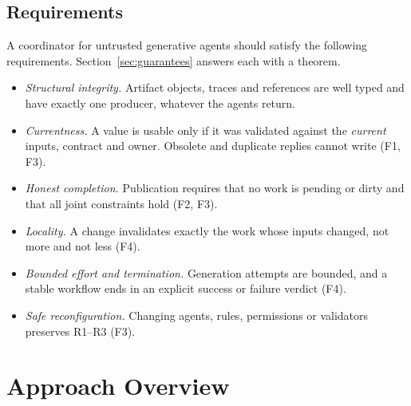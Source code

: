 \documentclass[10pt,journal,compsoc]{IEEEtran}
\theoremstyle{plain}
\theoremstyle{definition}
\begin{document}
\subsection{Requirements}\label{sec:requirements}
A coordinator for untrusted generative agents should satisfy the following requirements. Section~\ref{sec:guarantees} answers each with a theorem.
\begin{itemize}
\item[\textbf{R1}] \emph{Structural integrity.} Artifact objects, traces and references are well typed and have exactly one producer, whatever the agents return.
\item[\textbf{R2}] \emph{Currentness.} A value is usable only if it was validated against the \emph{current} inputs, contract and owner. Obsolete and duplicate replies cannot write (F1, F3).
\item[\textbf{R3}] \emph{Honest completion.} Publication requires that no work is pending or dirty and that all joint constraints hold (F2, F3).
\item[\textbf{R4}] \emph{Locality.} A change invalidates exactly the work whose inputs changed, not more and not less (F4).
\item[\textbf{R5}] \emph{Bounded effort and termination.} Generation attempts are bounded, and a stable workflow ends in an explicit success or failure verdict (F4).
\item[\textbf{R6}] \emph{Safe reconfiguration.} Changing agents, rules, permissions or validators preserves R1--R3 (F3).
\end{itemize}

\section{Approach Overview}\label{sec:overview}
\end{document}
